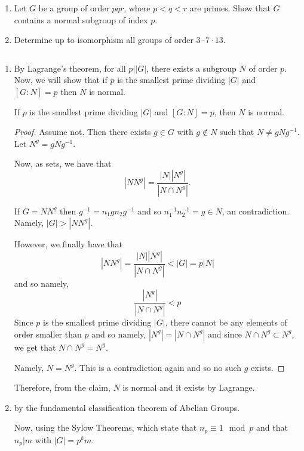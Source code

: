 \documentclass[12pt]{AlgebraQual}
\begin{document}
\begin{problem} $\,$
\begin{enumerate}[label=(\alph*)]
    \item Let $G$ be a group of order $pqr$, where $p<q<r$ are primes. Show that $G$ contains a normal subgroup of index $p.$
    \item Determine up to isomorphism all groups of order $3\cdot7\cdot 13$.
\end{enumerate}
\end{problem}


\begin{solution}$\,$
\begin{enumerate}[label=(\alph*)]
    \item By Lagrange's theorem, for all $p||G|$, there exists a subgroup $N$ of order $p.$ Now, we will show that if $p$ is the smallest prime dividing $|G|$ and $[G:N]=p$ then $N$ is normal.

    \begin{claim} If $p$ is the smallest prime dividing $|G|$ and $[G:N]=p$, then $N$ is normal.
    \begin{proof} Assume not. Then there exists $g\in G$ with $g\notin N$ such that $N\not=gNg^{-1}$. Let $N^g=gNg^{-1}$.

    Now, as sets, we have that $$|NN^g|=\frac{|N||N^g|}{|N\cap N^g|}.$$

    If $G=NN^g$ then $g^{-1}=n_1gn_2g^{-1}$ and so $n_1^{-1}n_2^{-1}=g\in N$, an contradiction. Namely, $|G|>|NN^g|$.

    However, we finally have that $$|NN^g|=\frac{|N||N^g|}{|N\cap N^g|}<|G|=p|N|$$ and so namely, $$\frac{|N^g|}{|N\cap N^g|}<p$$ Since $p$ is the smallest prime dividing $|G|$, there cannot be any elements of order smaller than $p$ and so namely, $|N^g|=|N\cap N^g|$ and since $N\cap N^g\subset N^g$, we get that $N\cap N^g=N^g$.

    Namely, $N=N^g$. This is a contradiction again and so no such $g$ exists.
    \end{proof}
    \end{claim}

    Therefore, from the claim, $N$ is normal and it exists by Lagrange.

    \item {} by the fundamental classification theorem of Abelian Groups.

    Now, using the Sylow Theorems, which state that $n_p\equiv 1\mod p$ and that $n_p|m$ with $|G|=p^km$.


\end{enumerate}
\end{solution}
\end{document}
